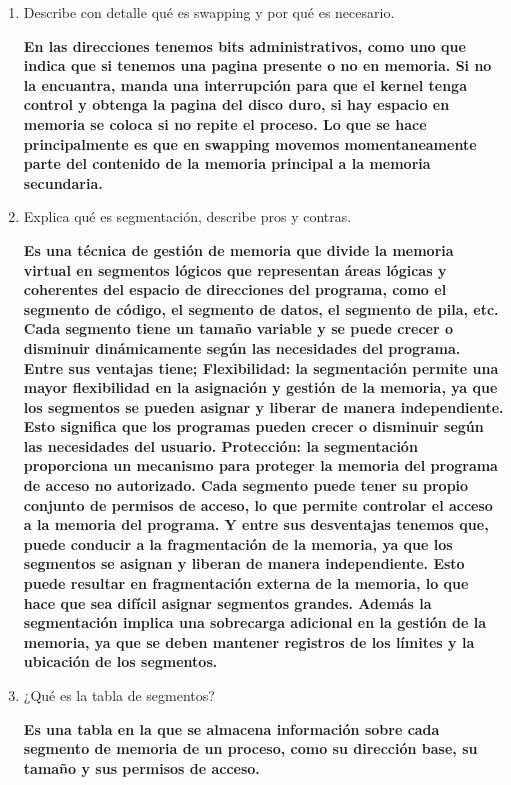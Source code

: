 \documentclass[12pt]{article}
\begin{document}
\begin{enumerate}
    \item Describe con detalle qué es swapping y por qué es necesario. 
    \vspace{2mm}

    \textbf{En las direcciones tenemos bits administrativos, como uno que indica que si tenemos una pagina presente o no en memoria.
    Si no la encuantra, manda una interrupción para que el kernel tenga control y obtenga la pagina del disco duro, si hay espacio en memoria se coloca si no repite el proceso.
    Lo que se hace principalmente es que en swapping movemos momentaneamente parte del contenido de la memoria principal a la memoria secundaria.}

    \item Explica qué es segmentación, describe pros y contras.
    \vspace{2mm}

    \textbf{Es una técnica de gestión de memoria que divide la memoria virtual en segmentos lógicos que representan áreas lógicas y coherentes del espacio de direcciones del programa, como el segmento de código, el segmento de datos, el segmento de pila, etc. Cada segmento tiene un tamaño variable y se puede crecer o disminuir dinámicamente según las necesidades del programa.
    Entre sus ventajas tiene; Flexibilidad: la segmentación permite una mayor flexibilidad en la asignación y gestión de la memoria, ya que los segmentos se pueden asignar y liberar de manera independiente. Esto significa que los programas pueden crecer o disminuir según las necesidades del usuario.
    Protección: la segmentación proporciona un mecanismo para proteger la memoria del programa de acceso no autorizado. Cada segmento puede tener su propio conjunto de permisos de acceso, lo que permite controlar el acceso a la memoria del programa.
    Y entre sus desventajas tenemos que, puede conducir a la fragmentación de la memoria, ya que los segmentos se asignan y liberan de manera independiente. Esto puede resultar en fragmentación externa de la memoria, lo que hace que sea difícil asignar segmentos grandes.
    Además la segmentación implica una sobrecarga adicional en la gestión de la memoria, ya que se deben mantener registros de los límites y la ubicación de los segmentos.}

    \item ¿Qué es la tabla de segmentos?  
    \vspace{2mm}

    \textbf{Es una tabla en la que se almacena información sobre cada segmento de memoria de un proceso, como su dirección base, su tamaño y sus permisos de acceso.}


\end{enumerate}
\end{document}
